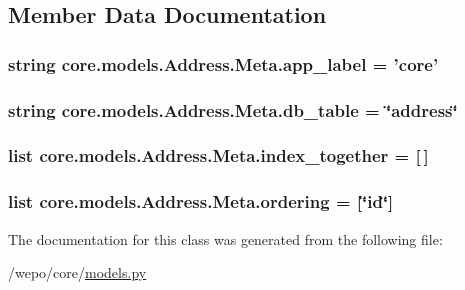 \subsection{Member Data Documentation}
\hypertarget{classcore_1_1models_1_1Address_1_1Meta_a41c3b230056eb829cb99072a78407275}{
\subsubsection[{app\-\_\-label}]{\setlength{\rightskip}{0pt plus 5cm}string core.\-models.\-Address.\-Meta.\-app\-\_\-label = 'core'\hspace{0.3cm}{\ttfamily [static]}}}\label{classcore_1_1models_1_1Address_1_1Meta_a41c3b230056eb829cb99072a78407275}
\hypertarget{classcore_1_1models_1_1Address_1_1Meta_afb7542f2077d35eb48a61be943943a72}{
\subsubsection[{db\-\_\-table}]{\setlength{\rightskip}{0pt plus 5cm}string core.\-models.\-Address.\-Meta.\-db\-\_\-table = \char`\"{}address\char`\"{}\hspace{0.3cm}{\ttfamily [static]}}}\label{classcore_1_1models_1_1Address_1_1Meta_afb7542f2077d35eb48a61be943943a72}
\hypertarget{classcore_1_1models_1_1Address_1_1Meta_af82184641195388b379e98b943300827}{
\subsubsection[{index\-\_\-together}]{\setlength{\rightskip}{0pt plus 5cm}list core.\-models.\-Address.\-Meta.\-index\-\_\-together = \mbox{[}$\,$\mbox{]}\hspace{0.3cm}{\ttfamily [static]}}}\label{classcore_1_1models_1_1Address_1_1Meta_af82184641195388b379e98b943300827}
\hypertarget{classcore_1_1models_1_1Address_1_1Meta_aff66ed8857615a1bcdd7c791aec9eafd}{
\subsubsection[{ordering}]{\setlength{\rightskip}{0pt plus 5cm}list core.\-models.\-Address.\-Meta.\-ordering = \mbox{[}\char`\"{}id\char`\"{}\mbox{]}\hspace{0.3cm}{\ttfamily [static]}}}\label{classcore_1_1models_1_1Address_1_1Meta_aff66ed8857615a1bcdd7c791aec9eafd}


The documentation for this class was generated from the following file\-:\begin{DoxyCompactItemize}
\item 
/wepo/core/\hyperlink{models_8py}{models.\-py}\end{DoxyCompactItemize}
